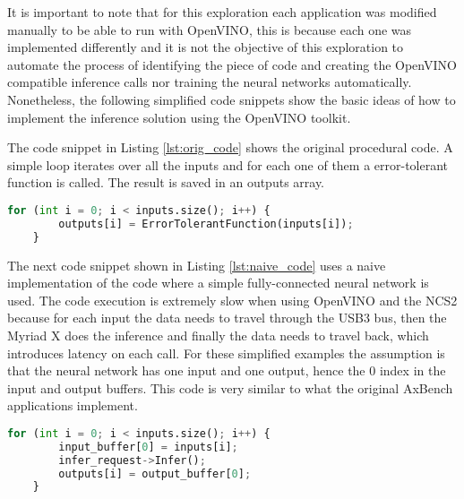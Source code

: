It is important to note that for this exploration each application was modified manually to be able to run with OpenVINO, this is because each one was implemented differently and it is not the objective of this exploration to automate the process of identifying the piece of code and creating the OpenVINO compatible inference calls nor training the neural networks automatically. Nonetheless, the following simplified code snippets show the basic ideas of how to implement the inference solution using the OpenVINO toolkit.

The code snippet in Listing \ref{lst:orig_code} shows the original procedural code. A simple loop iterates over all the inputs and for each one of them a error-tolerant function is called. The result is saved in an outputs array.

\begin{minipage}{\linewidth}
\begin{lstlisting}[frame=single, tabsize=4, caption={Procedural code of an error-tolerant function.},label={lst:orig_code},language=Python,captionpos=b]
	for (int i = 0; i < inputs.size(); i++) {
		outputs[i] = ErrorTolerantFunction(inputs[i]);
	}
\end{lstlisting}
\end{minipage}

The next code snippet shown in Listing \ref{lst:naive_code} uses a naive implementation of the code where a simple fully-connected neural network is used. The code execution is extremely slow when using OpenVINO and the NCS2 because for each input the data needs to travel through the USB3 bus, then the Myriad X does the inference and finally the data needs to travel back, which introduces latency on each call. For these simplified examples the assumption is that the neural network has one input and one output, hence the 0 index in the input and output buffers. This code is very similar to what the original AxBench applications implement.

\begin{minipage}{\linewidth}
\begin{lstlisting}[frame=single, tabsize=4, caption={Simple algorithmic transformation of an error tolerant-function using OpenVINO.},label={lst:naive_code},language=Python,captionpos=b]
	for (int i = 0; i < inputs.size(); i++) {
		input_buffer[0] = inputs[i];
		infer_request->Infer();
		outputs[i] = output_buffer[0];
	}
\end{lstlisting}
\end{minipage}

